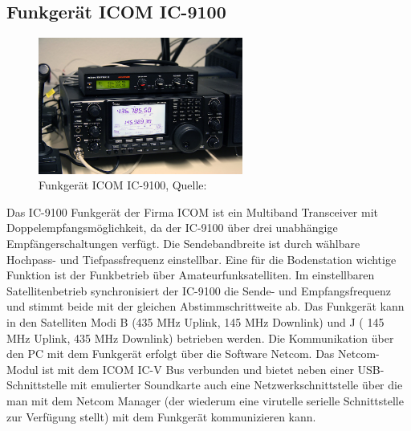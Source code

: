 \subsection{Funkgerät ICOM IC-9100}
\begin{figure}[h]
 \centering
 \includegraphics[width=0.6\textwidth]{images/radio}
 \caption{Funkgerät ICOM IC-9100, Quelle: \cite{dk0te}}
 \label{fig:radio}
\end{figure}
Das IC-9100 Funkgerät der Firma ICOM ist ein Multiband Transceiver mit Doppelempfangsmöglichkeit, da der IC-9100 über drei unabhängige 
Empfängerschaltungen verfügt. Die Sendebandbreite ist durch wählbare Hochpass- und Tiefpassfrequenz einstellbar. Eine für die Bodenstation wichtige 
Funktion ist der Funkbetrieb über Amateurfunksatelliten. Im einstellbaren Satellitenbetrieb synchronisiert der IC-9100 die Sende-  und 
Empfangsfrequenz und stimmt beide mit der gleichen Abstimmschrittweite ab. Das Funkgerät kann in den Satelliten Modi B (435 MHz Uplink, 145 MHz 
Downlink) und J ( 145 MHz Uplink, 435 MHz Downlink) betrieben werden. Die Kommunikation über den PC mit dem Funkgerät erfolgt über die Software 
Netcom.  Das Netcom-Modul ist mit dem ICOM IC-V Bus verbunden und bietet neben einer USB-Schnittstelle mit emulierter 
Soundkarte auch eine Netzwerkschnittstelle über die man mit dem Netcom Manager (der wiederum eine virutelle serielle Schnittstelle zur Verfügung 
stellt) mit dem Funkgerät kommunizieren kann.

  


 
